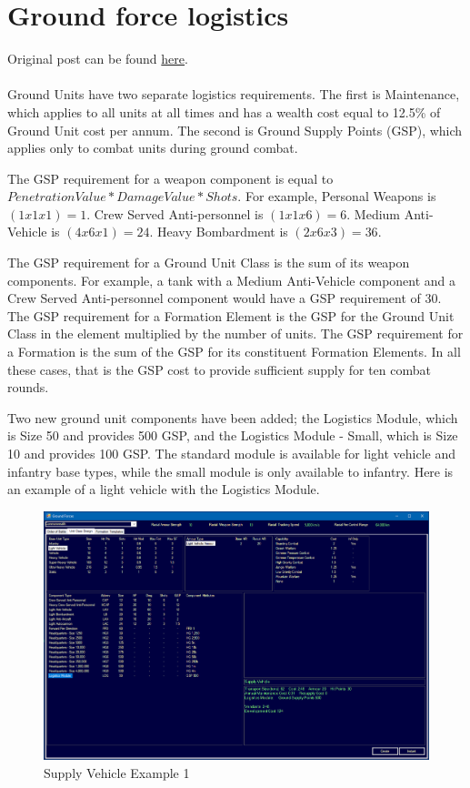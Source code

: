 \documentclass[../../Aurora C# unofficial manual.tex]{subfiles}
\begin{document}
	\section{Ground force logistics}
	Original post can be found
	\href{http://aurora2.pentarch.org/index.php?topic=8495.msg109760#msg109760}{here}.
	\\\\
	
	Ground Units have two separate logistics requirements. The first is Maintenance, which applies to all units at all times and has a wealth cost equal to 12.5\% of Ground Unit cost per annum. The second is Ground Supply Points (GSP), which applies only to combat units during ground combat.
	
	The GSP requirement for a weapon component is equal to \( Penetration Value * Damage Value * Shots \). For example, Personal Weapons is \( (1 x 1 x 1) = 1 \). Crew Served Anti-personnel is \( (1 x 1 x 6) = 6 \). Medium Anti-Vehicle is \( (4 x 6 x 1) = 24 \). Heavy Bombardment is \( (2 x 6 x 3) = 36 \).
	
	The GSP requirement for a Ground Unit Class is the sum of its weapon components. For example, a tank with a Medium Anti-Vehicle component and a Crew Served Anti-personnel component would have a GSP requirement of 30. The GSP requirement for a Formation Element is the GSP for the Ground Unit Class in the element multiplied by the number of units. The GSP requirement for a Formation is the sum of the GSP for its constituent Formation Elements. In all these cases, that is the GSP cost to provide sufficient supply for ten combat rounds.
	
	Two new ground unit components have been added; the Logistics Module, which is Size 50 and provides 500 GSP, and the Logistics Module - Small, which is Size 10 and provides 100 GSP. The standard module is available for light vehicle and infantry base types, while the small module is only available to infantry.  Here is an example of a light vehicle with the Logistics Module.
	\begin{figure}[H]
		\centering
		\includegraphics[width=0.95\linewidth]{images/SupplyVehicle}
		\caption[Supply Vehicle]{Supply Vehicle Example 1}
		\label{fig:supplyvehicle}
	\end{figure}
	
\end{document}
